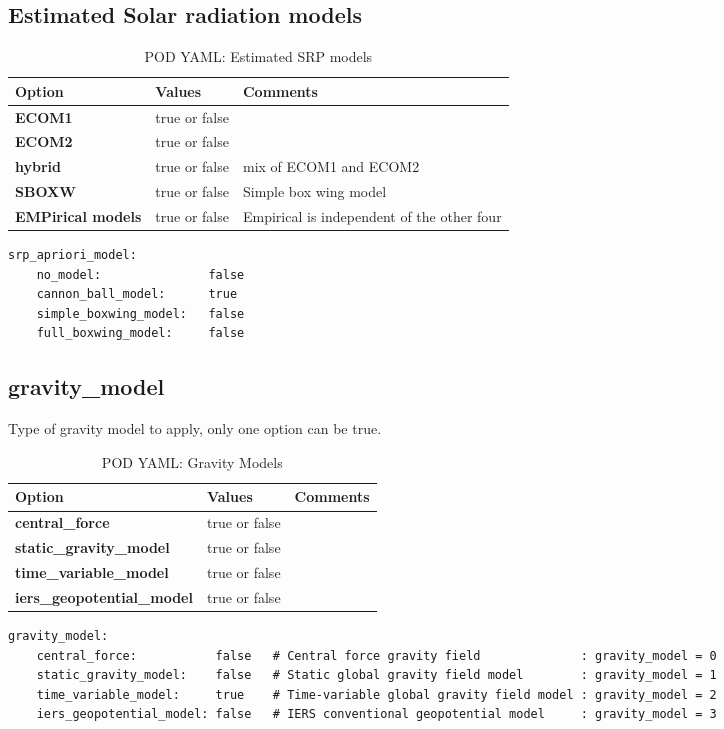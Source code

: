 \subsection{Estimated Solar radiation models}
\begin{table}[h!]
	\begin{tabular}{|p{4.5cm}|p{2cm}|p{3.5cm}|}
		\hline
		Option & Values & Comments \\
		\hline
		\textbf{ECOM1}  & true or false & \\ 
		\textbf{ECOM2}  & true or false & \\
		\textbf{hybrid} & true or false &  mix of ECOM1 and ECOM2\\
		\textbf{SBOXW}  & true or  false & Simple box wing model\\
		\textbf{EMPirical models} & true or false & Empirical is independent of the other four\\
		\hline
	\end{tabular}
	\caption{POD YAML: Estimated SRP models}
	\label{table:pod_yaml_est_srp_model}
\end{table}
%
%
\begin{lstlisting}[language=xml,caption=yaml example for apriori srp model options]
srp_apriori_model:
	no_model:               false
	cannon_ball_model:      true
	simple_boxwing_model:   false
	full_boxwing_model:     false
\end{lstlisting}
%
\subsection{gravity\_model}
Type of gravity model to apply, only one option can be true.
\begin{table}[h!]
	\begin{tabular}{|p{4.5cm}|p{2cm}|p{3.5cm}|}
		\hline
		Option & Values & Comments \\
		\hline
		\textbf{central\_force}            & true or false &  \\ 
		\textbf{static\_gravity\_model}    & true or false &  \\
		\textbf{time\_variable\_model}     & true or false &  \\
		\textbf{iers\_geopotential\_model} & true or false &  \\
		\hline
	\end{tabular}
	\caption{POD YAML: Gravity Models}
	\label{table:pod_yaml_gravity_models}
\end{table}
%
\begin{lstlisting}[language=xml,caption=yaml example for gravitational force model options]
gravity_model:
	central_force:           false   # Central force gravity field              : gravity_model = 0
	static_gravity_model:    false   # Static global gravity field model        : gravity_model = 1
	time_variable_model:     true    # Time-variable global gravity field model : gravity_model = 2
	iers_geopotential_model: false   # IERS conventional geopotential model     : gravity_model = 3
\end{lstlisting}
%

